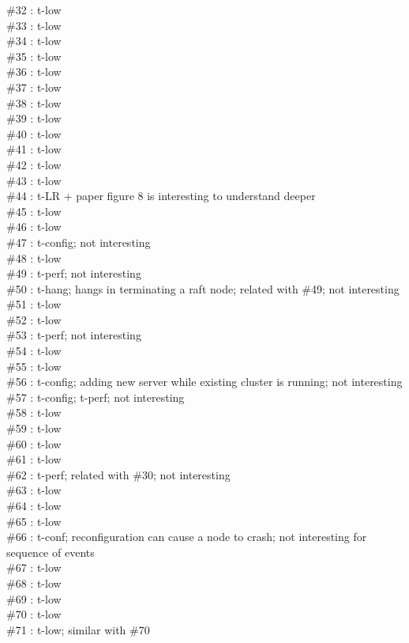 \#32 : t-low\\
\#33 : t-low\\
\#34 : t-low\\
\#35 : t-low\\
\#36 : t-low\\
\#37 : t-low\\
\#38 : t-low\\
\#39 : t-low\\
\#40 : t-low\\
\#41 : t-low\\
\#42 : t-low\\
\#43 : t-low\\
\#44 : t-LR + paper figure 8 is interesting to understand deeper\\
\#45 : t-low\\
\#46 : t-low\\
\#47 : t-config; not interesting\\
\#48 : t-low\\
\#49 : t-perf; not interesting\\
\#50 : t-hang; hangs in terminating a raft node; related with \#49; not interesting\\
\#51 : t-low\\
\#52 : t-low\\
\#53 : t-perf; not interesting\\
\#54 : t-low\\
\#55 : t-low\\
\#56 : t-config; adding new server while existing cluster is running; not interesting\\
\#57 : t-config; t-perf; not interesting\\
\#58 : t-low\\
\#59 : t-low\\
\#60 : t-low\\
\#61 : t-low\\
\#62 : t-perf; related with \#30; not interesting\\
\#63 : t-low\\
\#64 : t-low\\
\#65 : t-low\\
\#66 : t-conf; reconfiguration can cause a node to crash; not interesting for sequence of events\\
\#67 : t-low\\
\#68 : t-low\\
\#69 : t-low\\
\#70 : t-low\\
\#71 : t-low; similar with \#70\\
